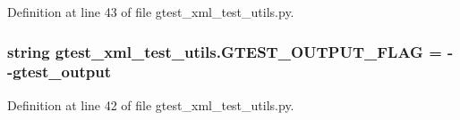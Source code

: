Definition at line 43 of file gtest\+\_\+xml\+\_\+test\+\_\+utils.\+py.

\subsubsection[{\texorpdfstring{G\+T\+E\+S\+T\+\_\+\+O\+U\+T\+P\+U\+T\+\_\+\+F\+L\+AG}{GTEST_OUTPUT_FLAG}}]{\setlength{\rightskip}{0pt plus 5cm}string gtest\+\_\+xml\+\_\+test\+\_\+utils.\+G\+T\+E\+S\+T\+\_\+\+O\+U\+T\+P\+U\+T\+\_\+\+F\+L\+AG = \textquotesingle{}-\/-\/gtest\+\_\+output\textquotesingle{}}\hypertarget{namespacegtest__xml__test__utils_aa354c3ca453d90f496f4cbc576406fb2}{}\label{namespacegtest__xml__test__utils_aa354c3ca453d90f496f4cbc576406fb2}


Definition at line 42 of file gtest\+\_\+xml\+\_\+test\+\_\+utils.\+py.

